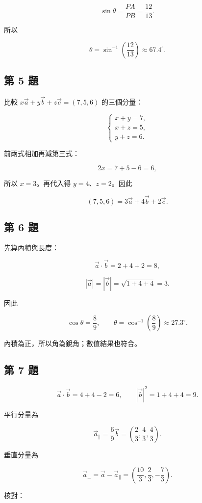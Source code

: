 \documentclass[11pt,a4paper]{article}
\begin{document}
\[
\sin\theta=\frac{PA}{PB}=\frac{12}{13}.
\]

所以

\[
\boxed{\theta=\sin^{-1}\!\left(\frac{12}{13}\right)\approx67.4^\circ}.
\]

\subsection{第 5 題}\label{ux7b2c-5-ux984c}

比較 \(x\vec a+y\vec b+z\vec c=(7,5,6)\) 的三個分量：

\[
\begin{cases}
x+y=7,\\
x+z=5,\\
y+z=6.
\end{cases}
\]

前兩式相加再減第三式：

\[
2x=7+5-6=6,
\]

所以 \(x=3\)。再代入得 \(y=4\)、\(z=2\)。因此

\[
\boxed{(7,5,6)=3\vec a+4\vec b+2\vec c}.
\]

\subsection{第 6 題}\label{ux7b2c-6-ux984c}

先算內積與長度：

\[
\vec a\cdot\vec b=2+4+2=8,
\]

\[
|\vec a|=|\vec b|=\sqrt{1+4+4}=3.
\]

因此

\[
\cos\theta=\frac89,
\qquad
\boxed{\theta=\cos^{-1}\!\left(\frac89\right)\approx27.3^\circ}.
\]

內積為正，所以角為銳角；數值結果也符合。

\subsection{第 7 題}\label{ux7b2c-7-ux984c}

\[
\vec a\cdot\vec b=4+4-2=6,
\qquad
|\vec b|^2=1+4+4=9.
\]

平行分量為

\[
\vec a_\parallel
=\frac69\vec b
=\left(\frac23,\frac43,\frac43\right).
\]

垂直分量為

\[
\vec a_\perp
=\vec a-\vec a_\parallel
=\left(\frac{10}3,\frac23,-\frac73\right).
\]

核對：
\end{document}
